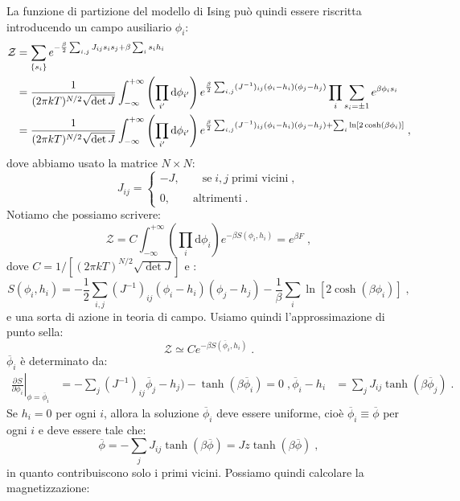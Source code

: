 \documentclass[10pt,a4paper]{report}
\theoremstyle{definition}
\newcommand{\pdev}[3][]{\frac{\partial^{#1} #2}{\partial #3^{#1}}}
\numberwithin{equation}{section}
\newcommand{\diff}[1][]{\mathrm{d}#1}
\newcommand{\zpart}{\mathcal{Z}}
\begin{document}
La funzione di partizione del modello di Ising può quindi  essere riscritta introducendo un campo ausiliario $\phi_i$:
\begin{align}
\zpart &= \sum_{\{s_i\}}e^{-\frac{\beta}{2}\sum_{i,j}J_{ij}s_is_j+\beta\sum_is_ih_i} \notag \\
&= \frac{1}{(2\pi kT)^{N/2}\sqrt{\det J}}\int_{-\infty}^{+\infty}\left(\prod_{i'}\diff{\phi_{i'}}\right)e^{\frac{\beta}{2}\sum_{i,j}(J^{-1})_{ij}(\phi_i-h_i)(\phi_j-h_j)}\prod_i\sum_{s_i=\pm 1}e^{\beta\phi_is_i} \notag \\
&= \frac{1}{(2\pi kT)^{N/2}\sqrt{\det J}}\int_{-\infty}^{+\infty}\left(\prod_{i'}\diff{\phi_{i'}}\right)e^{\frac{\beta}{2}\sum_{i,j}(J^{-1})_{ij}(\phi_i-h_i)(\phi_j-h_j)+\sum_i\ln[2\cosh(\beta \phi_i)]}\;,
\end{align}
dove abbiamo usato la matrice $N\times N$:
\begin{equation}
J_{ij}=\begin{cases}
-J,\qquad \mbox{se}\; i,j\;\mbox{primi vicini}\;, \\
\\
0,\qquad \mbox{altrimenti}\;.
\end{cases}
\end{equation}
Notiamo che possiamo scrivere:
$$
\zpart=C\int_{-\infty}^{+\infty}\left(\prod_i\diff{\phi_i}\right)e^{-\beta S(\phi_i,h_i)}=e^{\beta F}\;,
$$
dove $C=1/[(2\pi kT)^{N/2}\sqrt{\det J}]$ e :
\begin{equation}
S(\phi_i,h_i)=-\frac{1}{2}\sum_{i,j}(J^{-1})_{ij}(\phi_i-h_i)(\phi_j-h_j)-\frac{1}{\beta}\sum_i\ln[2\cosh(\beta \phi_i)]\;,
\end{equation}
e una sorta di azione in teoria di campo. Usiamo quindi l'approssimazione di punto sella:
$$
\zpart\simeq Ce^{-\beta S(\overline{\phi}_i,h_i)}\;.
$$
$\overline{\phi}_i$ è determinato da:
\begin{align*}
\left.\pdev{S}{\phi_i}\right|_{\phi=\overline{\phi}_i}&=-\sum_j(J^{-1})_{ij}\overline{\phi}_j-h_j)-\tanh(\beta\overline{\phi}_i)=0\;,
\overline{\phi}_i-h_i &= \sum_j J_{ij}\tanh(\beta\overline{\phi}_j)\;.
\end{align*}
Se $h_i=0$ per ogni $i$, allora la soluzione $\overline{\phi}_i$ deve essere uniforme, cioè $\overline{\phi}_i\equiv\overline{\phi}$ per ogni $i$ e deve essere tale che:
\begin{equation}
\overline{\phi}=-\sum_jJ_{ij}\tanh(\beta\overline{\phi})=Jz\tanh(\beta\overline{\phi})\;,
\end{equation}
in quanto contribuiscono solo i primi vicini. Possiamo quindi calcolare la magnetizzazione:
\end{document}
